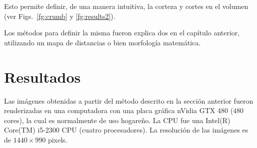 Esto permite definir, de una manera intuitiva, la corteza y cortes en el volumen (ver Figs.~\ref{fg:crumb} y \ref{fg:results2}).

Los métodos para definir la misma fueron explica
dos en el capítulo anterior, utilizando un mapa de distancias o bien morfología matemática.






\section{Resultados}
Las imágenes obtenidas a partir del método descrito en la sección anterior fueron renderizadas en una computadora con una placa gráfica nVidia GTX 480 ($480$ cores), la cual es normalmente de uso hogareño.
La CPU fue una Intel(R) Core(TM) i5-2300 CPU (cuatro procesadores).
La resolución de las imágenes es de $1440\times990$ pixels. 


